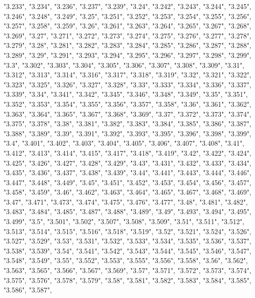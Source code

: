 \documentclass[]{article}
\begin{document}
\begin{itemize}
  "3.233", "3.234", "3.236", "3.237", "3.239", "3.24", "3.242", "3.243",
  "3.244", "3.245", "3.246", "3.248", "3.249", "3.25", "3.251", "3.252",
  "3.253", "3.254", "3.255", "3.256", "3.257", "3.258", "3.259", "3.26",
  "3.261", "3.263", "3.264", "3.265", "3.267", "3.268", "3.269", "3.27",
  "3.271", "3.272", "3.273", "3.274", "3.275", "3.276", "3.277",
  "3.278", "3.279", "3.28", "3.281", "3.282", "3.283", "3.284", "3.285",
  "3.286", "3.287", "3.288", "3.289", "3.29", "3.291", "3.293", "3.294",
  "3.295", "3.296", "3.297", "3.298", "3.299", "3.3", "3.302", "3.303",
  "3.304", "3.305", "3.306", "3.307", "3.308", "3.309", "3.31", "3.312",
  "3.313", "3.314", "3.316", "3.317", "3.318", "3.319", "3.32", "3.321",
  "3.322", "3.323", "3.325", "3.326", "3.327", "3.328", "3.33", "3.333",
  "3.334", "3.336", "3.337", "3.339", "3.34", "3.341", "3.342", "3.345",
  "3.346", "3.348", "3.349", "3.35", "3.351", "3.352", "3.353", "3.354",
  "3.355", "3.356", "3.357", "3.358", "3.36", "3.361", "3.362", "3.363",
  "3.364", "3.365", "3.367", "3.368", "3.369", "3.37", "3.372", "3.373",
  "3.374", "3.375", "3.378", "3.38", "3.381", "3.382", "3.383", "3.384",
  "3.385", "3.386", "3.387", "3.388", "3.389", "3.39", "3.391", "3.392",
  "3.393", "3.395", "3.396", "3.398", "3.399", "3.4", "3.401", "3.402",
  "3.403", "3.404", "3.405", "3.406", "3.407", "3.408", "3.41", "3.412",
  "3.413", "3.414", "3.415", "3.417", "3.418", "3.419", "3.42", "3.422",
  "3.424", "3.425", "3.426", "3.427", "3.428", "3.429", "3.43", "3.431",
  "3.432", "3.433", "3.434", "3.435", "3.436", "3.437", "3.438",
  "3.439", "3.44", "3.441", "3.443", "3.444", "3.446", "3.447", "3.448",
  "3.449", "3.45", "3.451", "3.452", "3.453", "3.454", "3.456", "3.457",
  "3.458", "3.459", "3.46", "3.462", "3.463", "3.464", "3.465", "3.467",
  "3.468", "3.469", "3.47", "3.471", "3.473", "3.474", "3.475", "3.476",
  "3.477", "3.48", "3.481", "3.482", "3.483", "3.484", "3.485", "3.487",
  "3.488", "3.489", "3.49", "3.493", "3.494", "3.495", "3.499", "3.5",
  "3.501", "3.502", "3.507", "3.508", "3.509", "3.51", "3.511", "3.512",
  "3.513", "3.514", "3.515", "3.516", "3.518", "3.519", "3.52", "3.521",
  "3.524", "3.526", "3.527", "3.529", "3.53", "3.531", "3.532", "3.533",
  "3.534", "3.535", "3.536", "3.537", "3.538", "3.539", "3.54", "3.541",
  "3.542", "3.543", "3.544", "3.545", "3.546", "3.547", "3.548",
  "3.549", "3.55", "3.552", "3.553", "3.555", "3.556", "3.558", "3.56",
  "3.562", "3.563", "3.565", "3.566", "3.567", "3.569", "3.57", "3.571",
  "3.572", "3.573", "3.574", "3.575", "3.576", "3.578", "3.579", "3.58",
  "3.581", "3.582", "3.583", "3.584", "3.585", "3.586", "3.587",

\end{itemize}
\end{document}
